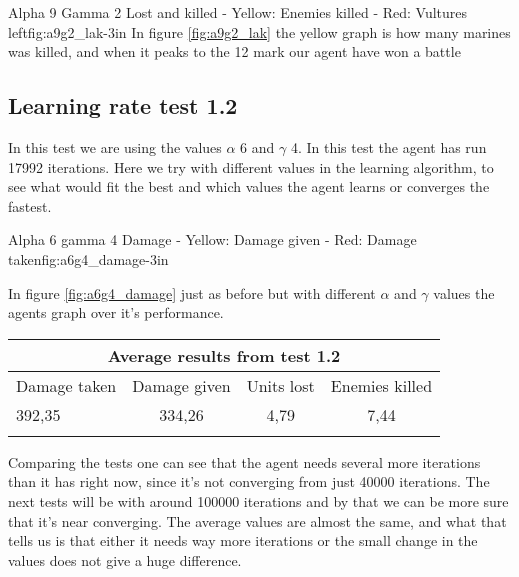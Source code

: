 




			{Alpha 9 Gamma 2 Lost and killed - Yellow: Enemies killed - Red: Vultures left}{fig:a9g2_lak}{-3in}
In figure \ref{fig:a9g2_lak} the yellow graph is how many marines was killed, and when it peaks to the 12 mark our agent have won a battle






\subsection*{Learning rate test 1.2}
In this test we are using the values $\alpha$ 6 and $\gamma$ 4. In this test the agent has run 17992 iterations. Here we try with different values in the learning algorithm, to see what would fit the best and which values the agent learns or converges the fastest.


			{Alpha 6 gamma 4 Damage - Yellow: Damage given - Red: Damage taken}{fig:a6g4_damage}{-3in}

In figure \ref{fig:a6g4_damage} just as before but with different $\alpha$ and $\gamma$ values the agents graph over it's performance.






\begin{centering}
 \begin{tabular}{|l||c|c|c|}
	\multicolumn{4}{c}{Average results from test 1.2} \\
	\hline
		Damage taken & Damage given & Units lost & Enemies killed\\
	\hline
		392,35 & 334,26 & 4,79 & 7,44 \\
	\hline
\label{test1.2}
\end{tabular}
\end{centering}





Comparing the tests one can see that the agent needs several more iterations than it has right now, since it's not converging from just 40000 iterations. The next tests will be with around 100000 iterations and by that we can be more sure that it's near converging. The average values are almost the same, and what that tells us is that either it needs way more iterations or the small change in the values does not give a huge difference.




